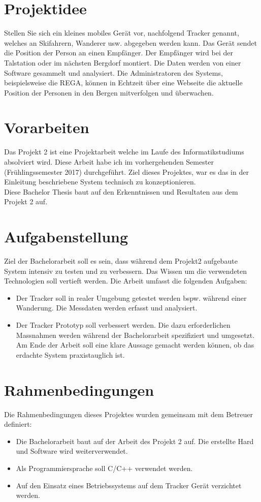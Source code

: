\documentclass[11pt,english,german]{report}
\theoremstyle{definition}
\begin{document}
\newpage
\section{Projektidee}
Stellen Sie sich ein kleines mobiles Gerät vor, nachfolgend Tracker genannt, welches an Skifahrern, Wanderer usw. abgegeben werden kann. Das Gerät sendet die Position der Person an einen Empfänger. Der Empfänger wird bei der Talstation oder im nächsten Bergdorf montiert. Die Daten werden von einer Software gesammelt und analysiert. Die Administratoren des Systems, beispielsweise die REGA, können in Echtzeit über eine Webseite die aktuelle Position der Personen in den Bergen mitverfolgen und überwachen.

\section{Vorarbeiten}
Das Projekt 2 ist eine Projektarbeit welche im Laufe des Informatikstudiums absolviert wird. Diese Arbeit habe ich im vorhergehenden Semester (Frühlingssemester 2017) durchgeführt. Ziel dieses Projektes, war es das in der Einleitung beschriebene System technisch zu konzeptionieren.\\[0.3cm]
Diese Bachelor Thesis baut auf den Erkenntnissen und Resultaten aus dem Projekt 2 auf.

\section{Aufgabenstellung}
Ziel der Bachelorarbeit soll es sein, dass während dem Projekt2 aufgebaute System intensiv zu testen und zu verbessern. Das Wissen um die verwendeten Technologien soll vertieft werden. Die Arbeit umfasst die folgenden Aufgaben:
\begin{itemize}
\item
Der Tracker soll in realer Umgebung getestet werden bspw. während einer Wanderung. Die Messdaten werden erfasst und analysiert.
\item Der Tracker Prototyp soll verbessert werden. Die dazu erforderlichen Massnahmen werden während der Bachelorarbeit spezifiziert und umgesetzt. Am Ende der Arbeit soll eine klare Aussage gemacht werden können, ob das erdachte System praxistauglich ist.
\end{itemize}

\section{Rahmenbedingungen}
Die Rahmenbedingungen dieses Projektes wurden gemeinsam mit dem Betreuer definiert:
\begin{itemize}
\item Die Bachelorarbeit baut auf der Arbeit des Projekt 2 auf. Die erstellte Hard und Software wird weiterverwendet.
\item Als Programmiersprache soll C/C++ verwendet werden.
\item Auf den Einsatz eines Betriebssystems auf dem Tracker Gerät verzichtet werden.
\end{itemize}
\end{document}
